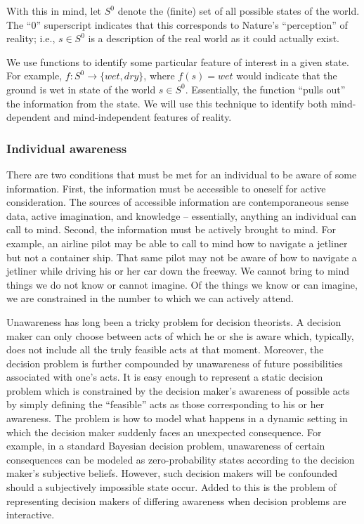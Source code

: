 \documentclass[
11pt,
titlepage,
reqno,
]{article}%
\theoremstyle{definition}
\begin{document}
	With this in mind, let $S^0$ denote the (finite) set of all possible states of the world.
	The  ``0'' superscript indicates that this corresponds to Nature's ``perception'' of reality; i.e., $s\in S^0$ is a description of the real world as it could actually exist. 

	We use functions to identify some particular feature of interest in a given state. For example, $f:S^0\rightarrow \{wet,dry\}$, where $f(s)=wet$ would indicate that the ground is wet in state of the world $s\in S^0$. Essentially, the function ``pulls out'' the information from the state. We will use this technique to identify both mind-dependent and mind-independent features of reality.

	\subsubsection{Individual awareness}


There are two conditions that must be met for an individual to be aware of some information. 
First, the information must be accessible to oneself for active consideration. 
The sources of accessible information are contemporaneous sense data, active imagination, and knowledge -- essentially, anything an individual can call to mind. 
Second, the information must be actively brought to mind. 
For example, an airline pilot may be able to call to mind how to navigate a jetliner but not a container ship. 
That same pilot may not be aware of how to navigate a jetliner while driving his or her car down the freeway. 
We cannot bring to mind things we do not know or cannot imagine.
Of the things we know or can imagine, we are constrained in the number to which we can actively attend. 

Unawareness has long been a tricky problem for decision theorists. 
A decision maker can only choose between acts of which he or she is aware which, typically, does not include all the truly feasible acts at that moment. 
Moreover, the decision problem is further compounded by unawareness of future possibilities associated with one's acts. 
It is easy enough to represent a static decision problem which is constrained by the decision maker's awareness of possible acts by simply  defining the ``feasible'' acts as those corresponding to his or her awareness.
The problem is how to model what happens in a dynamic setting in which the decision maker suddenly faces an unexpected consequence. 
For example, in a standard Bayesian decision problem, unawareness of certain consequences can be modeled as zero-probability states according to the decision maker's subjective beliefs. 
However, such decision makers will be confounded should a subjectively impossible state occur. 
Added to this is the problem of representing decision makers of differing awareness when decision problems are interactive. 
\end{document}
